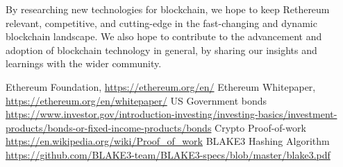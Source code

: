 \documentclass[a4paper,onecolumn, superscriptaddress,10pt,accepted=2020-05-01,issue=1, volume=2, shorttitle=papers]{compositionalityarticle}
\begin{document}
By researching new technologies for blockchain, we hope to keep Rethereum relevant, competitive, and cutting-edge in the fast-changing and dynamic blockchain landscape. We also hope to contribute to the advancement and adoption of blockchain technology in general, by sharing our insights and learnings with the wider community.



\newpage


\begin{thebibliography}{9}
\vspace{0.3cm}
  Ethereum Foundation,
  \href{https://ethereum.org/en/}{https://ethereum.org/en/}
\vspace{0.3cm}
  Ethereum Whitepaper,
  \href{https://ethereum.org/en/whitepaper/}{https://ethereum.org/en/whitepaper/}
\vspace{0.3cm}
  US Government bonds 
  \href{https://www.investor.gov/introduction-investing/investing-basics/investment-products/bonds-or-fixed-income-products/bonds}{https://www.investor.gov/introduction-investing/investing-basics/investment-products/bonds-or-fixed-income-products/bonds}
\vspace{0.3cm}
  Crypto Proof-of-work 
  \href{https://en.wikipedia.org/wiki/Proof_of_work}{https://en.wikipedia.org/wiki/Proof_of_work}
\vspace{0.3cm}
  BLAKE3 Hashing Algorithm
  \href{https://github.com/BLAKE3-team/BLAKE3-specs/blob/master/blake3.pdf}{https://github.com/BLAKE3-team/BLAKE3-specs/blob/master/blake3.pdf}


\end{thebibliography}

\onecolumn
\end{document}
